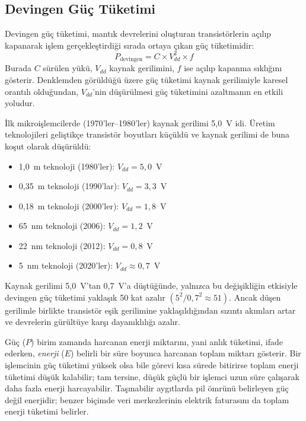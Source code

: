 \subsection{Devingen Güç Tüketimi}
\label{sec:devingen-guc}

Devingen güç tüketimi, mantık devrelerini oluşturan transistörlerin açılıp kapanarak işlem gerçekleştirdiği sırada ortaya çıkan güç tüketimidir:
\begin{equation}
P_{\text{devingen}} = C \times V_{dd}^2 \times f
\label{eq:devingen-guc}
\end{equation}
Burada $C$ sürülen yükü, $V_{dd}$ kaynak gerilimini, $f$ ise açılıp kapanma sıklığını gösterir. Denklemden görüldüğü üzere güç tüketimi kaynak gerilimiyle karesel orantılı olduğundan, $V_{dd}$'nin düşürülmesi güç tüketimini azaltmanın en etkili yoludur.

\begin{bilginot}
İlk mikroişlemcilerde (1970'ler--1980'ler) kaynak gerilimi 5{,}0~V idi. Üretim teknolojileri geliştikçe transistör boyutları küçüldü ve kaynak gerilimi de buna koşut olarak düşürüldü:
\begin{itemize}[nosep]
    \item 1{,}0~\textmu m teknoloji (1980'ler): $V_{dd} = 5{,}0$~V
    \item 0{,}35~\textmu m teknoloji (1990'lar): $V_{dd} = 3{,}3$~V
    \item 0{,}18~\textmu m teknoloji (2000'ler): $V_{dd} = 1{,}8$~V
    \item 65~nm teknoloji (2006): $V_{dd} = 1{,}2$~V
    \item 22~nm teknoloji (2012): $V_{dd} = 0{,}8$~V
    \item 5~nm teknoloji (2020'ler): $V_{dd} \approx 0{,}7$~V
\end{itemize}
Kaynak gerilimi 5{,}0~V'tan 0{,}7~V'a düştüğünde, yalnızca bu değişikliğin etkisiyle devingen güç tüketimi yaklaşık 50 kat azalır $(5^2 / 0{,}7^2 \approx 51)$. Ancak düşen gerilimle birlikte transistör eşik gerilimine yaklaşıldığından sızıntı akımları artar ve devrelerin gürültüye karşı dayanıklılığı azalır.
\end{bilginot}

Güç ($P$) birim zamanda harcanan enerji miktarını, yani anlık tüketimi, ifade ederken, \emph{enerji} ($E$) belirli bir süre boyunca harcanan toplam miktarı gösterir. Bir işlemcinin güç tüketimi yüksek olsa bile görevi kısa sürede bitirirse toplam enerji tüketimi düşük kalabilir; tam tersine, düşük güçlü bir işlemci uzun süre çalışarak daha fazla enerji harcayabilir. Taşınabilir aygıtlarda pil ömrünü belirleyen güç değil enerjidir; benzer biçimde veri merkezlerinin elektrik faturasını da toplam enerji tüketimi belirler.

